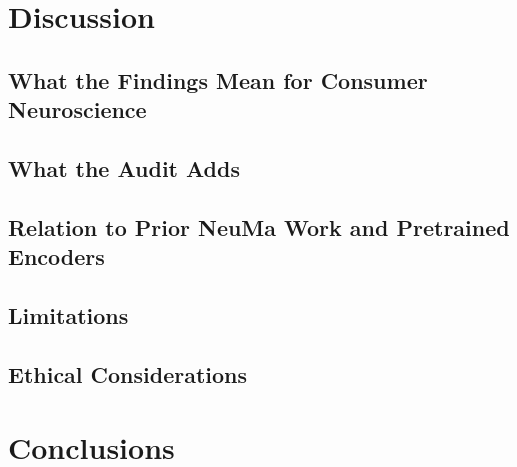 \section{Discussion}\label{sec:discussion}
\subsection{What the Findings Mean for Consumer Neuroscience}\label{disc:meaning}
\subsection{What the Audit Adds}\label{disc:protocol}
\subsection{Relation to Prior NeuMa Work and Pretrained Encoders}\label{disc:prior}
\subsection{Limitations}\label{disc:limits}
\subsection{Ethical Considerations}\label{disc:ethics}
\section{Conclusions}\label{sec:conclusion}
